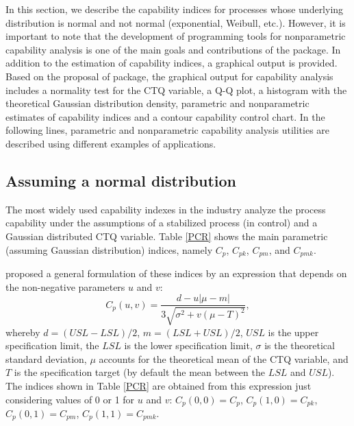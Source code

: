 In this section, we describe the capability indices for processes whose underlying distribution is normal and not normal (exponential, Weibull, etc.).
However, it is important to note that the development of programming tools for nonparametric capability analysis is one of the main goals and contributions of the  package. 
In addition to the estimation of capability indices, a graphical output is provided. 
Based on the proposal of  package, the  graphical output for capability analysis includes a normality test for the CTQ variable, a Q-Q plot, a histogram with the theoretical Gaussian distribution density, parametric and nonparametric estimates of capability indices and a contour capability control chart.
In the following lines, parametric and nonparametric capability analysis utilities are described using different examples of applications.

\subsection{Assuming a normal distribution}

The most widely used capability indexes in the industry analyze the process capability under the assumptions of a 
stabilized process (in control) and a Gaussian distributed CTQ variable.
Table \ref{PCR} shows the main parametric (assuming Gaussian distribution) indices, namely  $C_p$, $C_{pk}$, $C_{pm}$, and $C_{pmk}$.

\citet{vannman1995unified} proposed a general formulation of these indices by an expression that depends on the non-negative parameters $u$ and $v$:
$$ C_p\left( u,v\right)= \frac{d-u\vert \mu - m\vert}{3\sqrt{\sigma^2+v\left( \mu - T\right)^2}},$$
whereby $d=(USL-LSL)/2$, $m=(LSL+USL)/2$, $USL$ is the upper specification limit, the $LSL$ is the lower specification limit, $\sigma$ is the theoretical standard deviation, $\mu$ accounts for the theoretical mean of the CTQ variable, and $T$ is the specification target (by default the mean between the $LSL$ and $USL$). 
The indices shown in Table \ref{PCR} are obtained from this expression just considering values of 0 or 1 for $u$ and $v$: $C_p\left( 0, 0\right)  = C_p$, $C_p\left( 1, 0\right)  = C_{pk}$, $C_p\left( 0, 1\right)  = C_{pm}$,
$C_p\left( 1, 1\right)  = C_{pmk}$.\\


